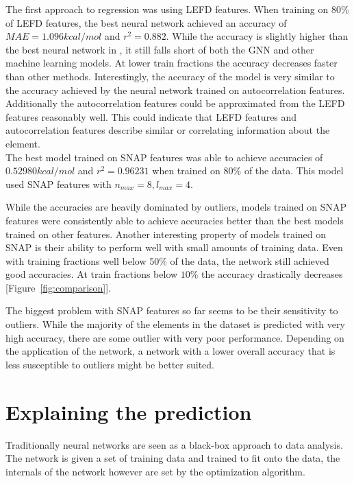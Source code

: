 The first approach to regression was using LEFD features.
When training on 80\% of LEFD features, the best neural network achieved an accuracy of $MAE = 1.096 kcal/mol$ and $r^2=0.882$.
While the accuracy is slightly higher than the best neural network in \cite{friederich_dos}, it still falls short 
of both the GNN and other machine learning models.
At lower train fractions the accuracy decreases faster than other methods.
Interestingly, the accuracy of the model is very similar to the accuracy achieved by the neural network trained on autocorrelation 
features.
Additionally the autocorrelation features could be approximated from the LEFD features reasonably well.
This could indicate that LEFD features and autocorrelation features describe
similar or correlating information about the element.
\\
The best model trained on SNAP features was able to achieve accuracies of $0.52980 kcal/mol$ and
$r^2 = 0.96231$ when trained on 80\% of the data.
This model used SNAP features with $n_{max}=8, l_{max}=4$.

While the accuracies are heavily dominated by outliers, models trained on SNAP features were consistently
able to achieve accuracies better than the best models trained on other features.
Another interesting property of models trained on SNAP is their ability to perform well with small amounts 
of training data.
Even with training fractions well below 50\% of the data, the network still achieved good accuracies.
At train fractions below $10\%$ the accuracy drastically decreases [Figure~\ref{fig:comparison}].

The biggest problem with SNAP features so far seems to be their sensitivity to outliers.
While the majority of the elements in the dataset is predicted with very high accuracy, 
there are some outlier with very poor performance.
Depending on the application of the network, a network with a lower overall accuracy 
that is less susceptible to outliers might be better suited.



\newpage
\section{Explaining the prediction}

Traditionally neural networks are seen as a black-box approach to data analysis.
The network is given a set of training data and trained to fit onto the data,
the internals of the network however are set by the optimization algorithm.

